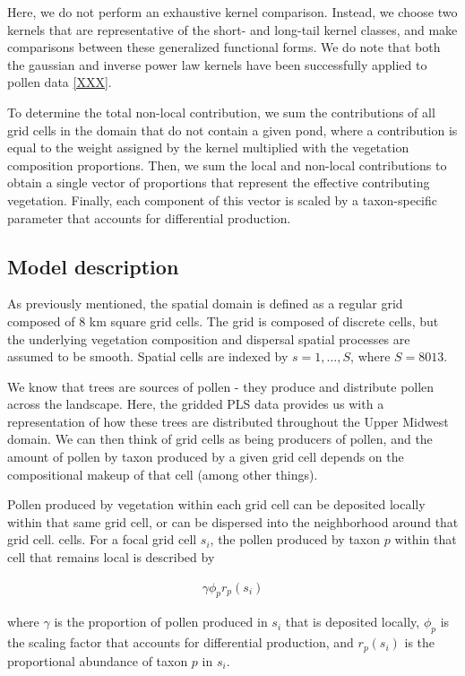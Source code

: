 \documentclass[12pt]{article}
\begin{document}
Here, we do not perform an exhaustive kernel comparison. Instead, we
choose two kernels that are representative of the short- and long-tail
kernel classes, and make comparisons between these generalized
functional forms. We do note that both the gaussian and inverse power
law kernels have been successfully applied to pollen data \ref{XXX}.

To determine the total non-local contribution, we sum the
contributions of all grid cells in the domain that do not contain a
given pond, where a contribution is equal to the weight assigned by
the kernel multiplied with the vegetation composition
proportions. Then, we sum the local and non-local contributions to
obtain a single vector of proportions that represent the effective
contributing vegetation. Finally, each component of this vector is
scaled by a taxon-specific parameter that accounts for differential
production.

\subsection{Model description}

As previously mentioned, the spatial domain is defined as a regular
grid composed of 8 km square grid cells. The grid is composed of
discrete cells, but the underlying vegetation composition and
dispersal spatial processes are assumed to be smooth. Spatial cells
are indexed by $s=1,\ldots,S$, where $S=8013$.

We know that trees are sources of pollen - they produce and distribute
pollen across the landscape. Here, the gridded PLS data provides us
with a representation of how these trees are distributed throughout
the Upper Midwest domain. We can then think of grid cells as being
producers of pollen, and the amount of pollen by taxon produced by a
given grid cell depends on the compositional makeup of that cell
(among other things).

Pollen produced by vegetation within each grid cell can be deposited
locally within that same grid cell, or can be dispersed into the
neighborhood around that grid cell.  cells. For a focal grid cell
$s_i$, the pollen produced by taxon $p$ within that cell that remains
local is described by

\begin{align}
\gamma \phi_p r_p(s_i)
\end{align} 

where $\gamma$ is the proportion of pollen produced in $s_i$ that is deposited locally,
$\phi_p$ is the scaling factor that accounts for differential
production, and $r_p(s_i)$ is the proportional abundance of taxon $p$
in $s_i$.
\end{document}
